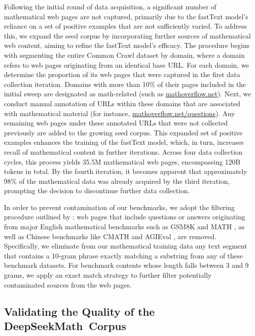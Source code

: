 \begin{itemize}[topsep=0pt]
Following the initial round of data acquisition, a significant number of mathematical web pages are not captured, primarily due to the fastText model's reliance on a set of positive examples that are not sufficiently varied. To address this, we expand the seed corpus by incorporating further sources of mathematical web content, aiming to refine the fastText model’s efficacy. The procedure begins with segmenting the entire Common Crawl dataset by domain, where a domain refers to web pages originating from an identical base URL. For each domain, we determine the proportion of its web pages that were captured in the first data collection iteration. Domains with more than 10\% of their pages included in the initial sweep are designated as math-related (such as \url{mathoverflow.net}). Next, we conduct manual annotation of URLs within these domains that are associated with mathematical material (for instance, \url{mathoverflow.net/questions}). Any remaining web pages under these annotated URLs that were not collected previously are added to the growing seed corpus. This expanded set of positive examples enhances the training of the fastText model, which, in turn, increases recall of mathematical content in further iterations. Across four data collection cycles, this process yields 35.5M mathematical web pages, encompassing 120B tokens in total. By the fourth iteration, it becomes apparent that approximately 98\% of the mathematical data was already acquired by the third iteration, prompting the decision to discontinue further data collection.

In order to prevent contamination of our benchmarks, we adopt the filtering procedure outlined by \cite{deepseek-coder}: web pages that include questions or answers originating from major English mathematical benchmarks such as GSM8K \citep{gsm8k} and MATH \citep{MATH}, as well as Chinese benchmarks like CMATH \citep{wei2023cmath} and AGIEval \citep{agieval}, are removed. Specifically, we eliminate from our mathematical training data any text segment that contains a 10-gram phrase exactly matching a substring from any of these benchmark datasets. For benchmark contents whose length falls between 3 and 9 grams, we apply an exact match strategy to further filter potentially contaminated sources from the web pages.

\subsection{Validating the Quality of the DeepSeekMath~Corpus}


\end{itemize}
